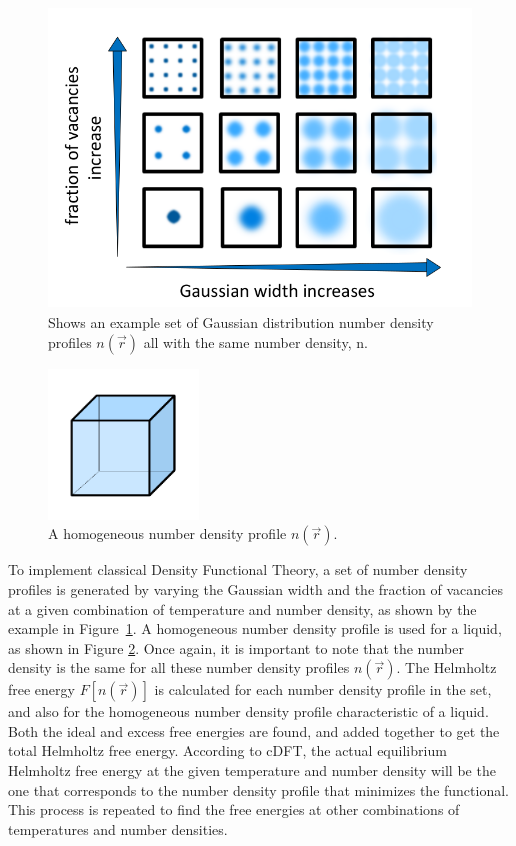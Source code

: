 \documentclass[double,12pt]{beavtex}
\begin{document}
\begin{figure}
   \centering
   \includegraphics[height=8cm]{VaryWidthandVacancies.png}
   \caption{Shows an example set of Gaussian distribution number density 
   profiles $n(\vec r)$ all with the same number density, n.}
   \label{fig:Ensemble_vary}
\end{figure}  
  
\begin{figure}
   \centering
   \includegraphics[height=4cm]{figs/homogeneous_bold-box.pdf}
   \caption{A homogeneous number density profile $n(\vec{r})$.}
   \label{fig:homogen_denisty}
\end{figure} 

To implement classical Density Functional Theory, 
a set of number density profiles is generated by varying the Gaussian width 
and the fraction of vacancies at a given combination of temperature and 
number density, as shown by the example in Figure~\ref{fig:Ensemble_vary}.
A homogeneous number density profile is used for a liquid, as shown in 
Figure \ref{fig:homogen_denisty}.
Once again, it is important to note that the number density is the same 
for all these number density profiles $n(\vec{r})$.  
The Helmholtz free energy $F[n(\vec{r})]$ is calculated for each number 
density profile in the set, and also for the homogeneous number density profile 
characteristic of a liquid. Both the ideal and excess free energies are 
found, and added together to get the total Helmholtz free energy.
According to cDFT, the actual equilibrium Helmholtz free energy at
the given temperature and number density will be the one
that corresponds to the number density profile that minimizes the functional. 
This process is repeated to find the free energies at other combinations 
of temperatures and number densities. 
\end{document}
